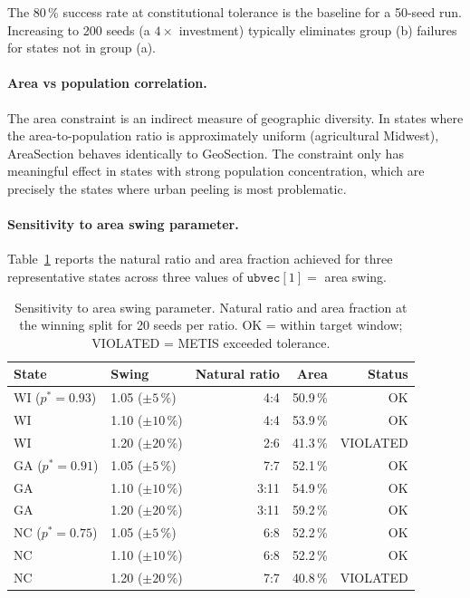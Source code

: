 The 80\,\% success rate at constitutional tolerance is the baseline for a 50-seed
run.
Increasing to 200 seeds (a $4\times$ investment) typically eliminates group (b)
failures for states not in group (a).

\paragraph{Area vs population correlation.}
The area constraint is an indirect measure of geographic diversity.
In states where the area-to-population ratio is approximately uniform
(agricultural Midwest), AreaSection behaves identically to GeoSection.
The constraint only has meaningful effect in states with strong
population concentration, which are precisely the states where urban peeling
is most problematic.

\paragraph{Sensitivity to area swing parameter.}
Table~\ref{tab:swing-sensitivity} reports the natural ratio and area fraction
achieved for three representative states across three values of
$\mathtt{ubvec}[1] = $ area swing.

\begin{table}[h]
\centering
\caption{Sensitivity to area swing parameter.
Natural ratio and area fraction at the winning split for 20 seeds per ratio.
OK = within target window; VIOLATED = METIS exceeded tolerance.}
\label{tab:swing-sensitivity}
\begin{tabular}{llrrr}
\toprule
State & Swing & Natural ratio & Area & Status \\
\midrule
WI ($p^* = 0.93$) & 1.05 ($\pm 5\,\%$) & 4:4 & 50.9\,\% & OK \\
WI & 1.10 ($\pm 10\,\%$) & 4:4 & 53.9\,\% & OK \\
WI & 1.20 ($\pm 20\,\%$) & 2:6 & 41.3\,\% & VIOLATED \\
\midrule
GA ($p^* = 0.91$) & 1.05 ($\pm 5\,\%$) & 7:7 & 52.1\,\% & OK \\
GA & 1.10 ($\pm 10\,\%$) & 3:11 & 54.9\,\% & OK \\
GA & 1.20 ($\pm 20\,\%$) & 3:11 & 59.2\,\% & OK \\
\midrule
NC ($p^* = 0.75$) & 1.05 ($\pm 5\,\%$) & 6:8 & 52.2\,\% & OK \\
NC & 1.10 ($\pm 10\,\%$) & 6:8 & 52.2\,\% & OK \\
NC & 1.20 ($\pm 20\,\%$) & 7:7 & 40.8\,\% & VIOLATED \\
\bottomrule
\end{tabular}
\end{table}

